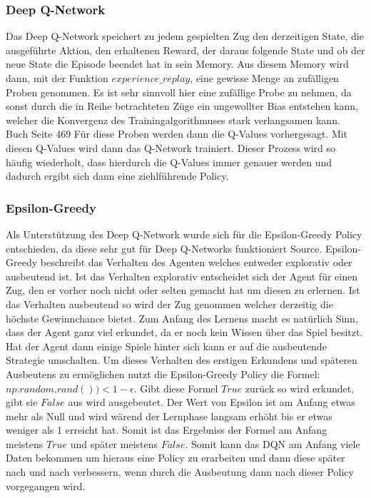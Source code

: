 \subsubsection{Deep Q-Network}
Das Deep Q-Network speichert zu jedem gespielten Zug den derzeitigen State, die ausgeführte Aktion, den erhaltenen Reward, der daraus folgende State und ob der neue State die Episode beendet hat in sein Memory. Aus diesem Memory wird dann, mit der Funktion $experience\_replay$, eine gewisse Menge an zufälligen Proben genommen. Es ist sehr sinnvoll hier eine zufällige Probe zu nehmen, da sonst durch die in Reihe betrachteten Züge ein ungewollter Bias entstehen kann, welcher die Konvergenz des Trainingalgorithmuses stark verlangsamen kann.
\colorbox{red!30}{Buch Seite 469}
Für diese Proben werden dann die Q-Values vorhergesagt. Mit diesen Q-Values wird dann das Q-Network trainiert. 
Dieser Prozess wird so häufig wiederholt, dass hierdurch die Q-Values immer genauer  werden und dadurch ergibt sich dann eine ziehlführende Policy.


\subsubsection{Epsilon-Greedy}
Als Unterstützung des Deep Q-Network wurde sich für die Epsilon-Greedy Policy entschieden, da diese sehr gut für Deep Q-Networks funktioniert \colorbox{red!30}{Source}. Epsilon-Greedy beschreibt das Verhalten des Agenten welches entweder explorativ oder ausbeutend ist. Ist das Verhalten explorativ entscheidet sich der Agent für einen Zug, den er vorher noch nicht oder selten gemacht hat um diesen zu erlernen. Ist das Verhalten ausbeutend so wird der Zug genommen welcher derzeitig die höchste Gewinnchance bietet. Zum Anfang des Lernens macht es natürlich Sinn, dass der Agent ganz viel erkundet, da er noch kein Wissen über das Spiel besitzt. Hat der Agent dann einige Spiele hinter sich kann er auf die ausbeutende Strategie umschalten. Um dieses Verhalten des erstigen Erkundens und späteren Ausbeutens zu ermöglichen nutzt die Epsilon-Greedy Policy die Formel: $np.random.rand())<1-\epsilon$. Gibt diese Formel $True$ zurück so wird erkundet, gibt sie $False$ aus wird ausgebeutet. Der Wert von Epsilon ist am Anfang etwas mehr als Null und wird wärend der Lernphase langsam erhöht bis er etwas weniger als 1 erreicht hat. Somit ist das Ergebniss der Formel am Anfang meistens $True$ und später meistens $False$. Somit kann das DQN am Anfang viele Daten bekommen um hieraus eine Policy zu erarbeiten und dann diese später nach und nach verbessern, wenn durch die Ausbeutung dann nach dieser Policy vorgegangen wird.


